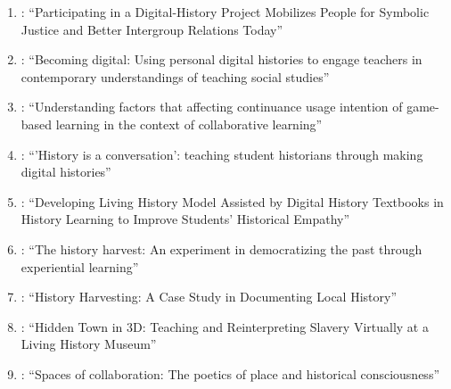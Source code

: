 \documentclass[
hf,
]{ceurart}
\begin{document}
\begin{enumerate}
    \item \citet{Ditlmann2025}: ``Participating in a Digital-History Project Mobilizes People for Symbolic Justice and Better Intergroup Relations Today''
    
    \item \citet{Lee2014159}: ``Becoming digital: Using personal digital histories to engage teachers in contemporary understandings of teaching social studies''
    
    \item \citet{Shiue20176445}: ``Understanding factors that affecting continuance usage intention of game-based learning in the context of collaborative learning''
    
    \item \citet{Bell2016}: ``'History is a conversation': teaching student historians through making digital histories''
    
    \item \citet{Darmawan2025}: ``Developing Living History Model Assisted by Digital History Textbooks in History Learning to Improve Students' Historical Empathy''
    
    \item \citet{Thomas2008}: ``The history harvest: An experiment in democratizing the past through experiential learning''
    
    \item \citet{Woodring2023}: ``History Harvesting: A Case Study in Documenting Local History''
    
    \item \citet{Lewis2021}: ``Hidden Town in 3D: Teaching and Reinterpreting Slavery Virtually at a Living History Museum''
    
    \item \citet{McLean20144}: ``Spaces of collaboration: The poetics of place and historical consciousness''
\end{enumerate}




\end{document}
